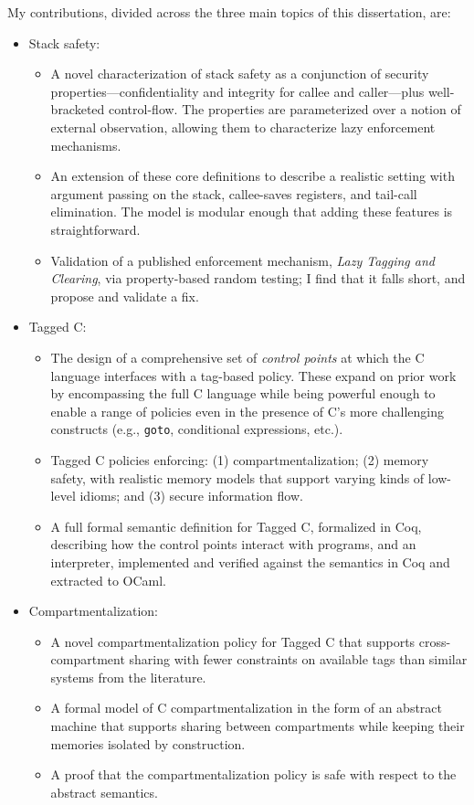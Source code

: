 \documentclass{report}
\begin{document}
My contributions, divided across the three main topics of this dissertation, are:
\begin{itemize}
\item Stack safety:
  \begin{itemize}
  \item A novel characterization of stack safety as a conjunction
    of security properties---confidentiality and integrity for callee
    and caller---plus well-bracketed control-flow.
    The properties are parameterized over a notion of
    external observation, allowing them to characterize lazy enforcement
    mechanisms.
  \item An extension of these core definitions to
    describe a realistic setting with argument passing on the stack,
    callee-saves registers, and tail-call elimination. The model is
    modular enough that adding these features is straightforward.
  \item Validation of a published enforcement mechanism,
    \emph{Lazy Tagging and Clearing}, via property-based random testing; I find that
    it falls short, and propose and validate a fix.
  \end{itemize}
\item Tagged C:
  \begin{itemize}
  \item The design of a comprehensive set of {\em control points} at which the C language interfaces
    with a tag-based policy. These expand on prior work by encompassing the full C language
    while being powerful enough to enable a range of policies even in the presence of C's more
    challenging constructs (e.g., {\tt goto}, conditional expressions, etc.).
  \item Tagged C policies enforcing: (1) compartmentalization;
    (2) memory safety, with realistic memory models that support varying kinds of low-level idioms;
    and (3) secure information flow.
  \item A full formal semantic definition for Tagged C, formalized in Coq, describing how the
    control points interact with programs, and an interpreter, implemented and verified against
    the semantics in Coq and extracted to OCaml.
  \end{itemize}
\item Compartmentalization:
  \begin{itemize}
  \item A novel compartmentalization policy for Tagged C that supports cross-compartment
    sharing with fewer constraints on available tags than similar systems from the literature.
  \item A formal model of C compartmentalization in the form of an abstract machine that
    supports sharing between compartments while keeping their memories isolated by construction.
  \item A proof that the compartmentalization policy is safe with respect to the abstract semantics.
  \end{itemize}
\end{itemize}
\end{document}
